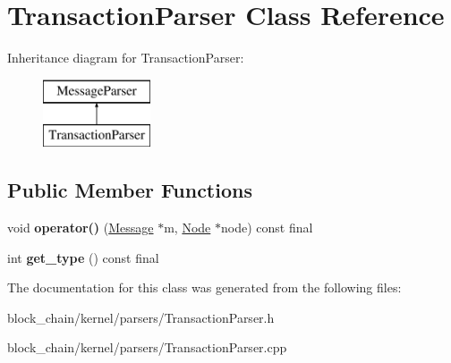 \hypertarget{classTransactionParser}{}\section{Transaction\+Parser Class Reference}
\label{classTransactionParser}
Inheritance diagram for Transaction\+Parser\+:\begin{figure}[H]
\begin{center}
\leavevmode
\includegraphics[height=2.000000cm]{classTransactionParser}
\end{center}
\end{figure}
\subsection*{Public Member Functions}
\begin{DoxyCompactItemize}
\item 
\mbox{\label{classTransactionParser_addb18b5cb23a07ef6a46c4d89a1c9f23}} 
void {\bfseries operator()} (\mbox{\hyperlink{classMessage}{Message}} $\ast$m, \mbox{\hyperlink{classNode}{Node}} $\ast$node) const final
\item 
\mbox{\label{classTransactionParser_a34bed6ceb924ae378b3b2e89a29ae230}} 
int {\bfseries get\+\_\+type} () const final
\end{DoxyCompactItemize}


The documentation for this class was generated from the following files\+:\begin{DoxyCompactItemize}
\item 
block\+\_\+chain/kernel/parsers/Transaction\+Parser.\+h\item 
block\+\_\+chain/kernel/parsers/Transaction\+Parser.\+cpp\end{DoxyCompactItemize}
